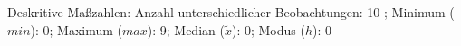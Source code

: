 				\label{tableValues:astu06c}
				\vspace*{-\baselineskip}
                    \begin{noten}
                	    \note{} Deskritive Maßzahlen:
                	    Anzahl unterschiedlicher Beobachtungen: 10%
                	    ; 
                	      Minimum ($min$): 0; 
                	      Maximum ($max$): 9; 
                	      Median ($\tilde{x}$): 0; 
                	      Modus ($h$): 0
                     \end{noten}


